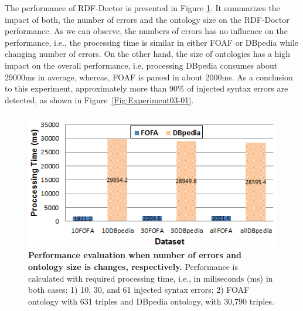 The performance of RDF-Doctor is presented in Figure \ref{Fig:Experiment03-03}. 
It summarizes the impact of both, the number of errors and the ontology size on the RDF-Doctor performance.
As we can observe, the numbers of errors has no influence on the performance, i.e., the processing time is similar in either FOAF or DBpedia while changing number of errors. 
On the other hand, the size of ontologies has a high impact on the overall performance, i.e, processing DBpedia consumes about 29000ms in average, whereas, FOAF is parsed in about 2000ms.   
As a conclusion to this experiment, approximately more than 90\% of injected syntax errors are detected, as shown in Figure~\ref{Fig:Experiment03-01}. 

\begin{figure}[ht]
\begin{center}
		\includegraphics[scale=0.9,angle=0]{images/Experiment03-03.png}
		\setlength\abovecaptionskip{-20mm}
		\setlength\belowcaptionskip{-5mm}
		\caption{\textbf{Performance evaluation when number of errors and ontology size is changes, respectively.} 
		Performance is calculated with required processing time, i.e., in miliseconds (ms) in both cases: 1) 10, 30, and 61 injected syntax errors; 2) FOAF ontology with 631 triples and DBpedia ontology, with 30,790 triples.}
\label{Fig:Experiment03-03}

\end{center}
\end{figure}
